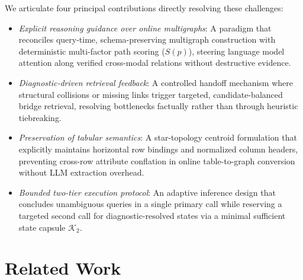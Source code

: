 \documentclass[runningheads]{llncs}
\begin{document}
\enlargethispage{2\baselineskip}
We articulate four principal contributions directly resolving these challenges:
\begin{itemize}
    \item \emph{Explicit reasoning guidance over online multigraphs}: A paradigm that reconciles query-time, schema-preserving multigraph construction with deterministic multi-factor path scoring ($S(p)$), steering language model attention along verified cross-modal relations without destructive evidence.
    \item \emph{Diagnostic-driven retrieval feedback}: A controlled handoff mechanism where structural collisions or missing links trigger targeted, candidate-balanced bridge retrieval, resolving bottlenecks factually rather than through heuristic tiebreaking.
    \item \emph{Preservation of tabular semantics}: A star-topology centroid formulation that explicitly maintains horizontal row bindings and normalized column headers, preventing cross-row attribute conflation in online table-to-graph conversion without LLM extraction overhead.
    \item \emph{Bounded two-tier execution protocol}: An adaptive inference design that concludes unambiguous queries in a single primary call while reserving a targeted second call for diagnostic-resolved states via a minimal sufficient state capsule $\mathcal{K}_2$.
\end{itemize}


\makeatletter
{}
\makeatother
\section{Related Work}
\label{sec:related}


\end{document}
